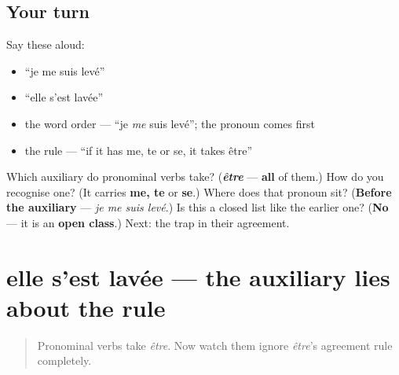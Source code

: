 \subsection*{Your turn}
Say these aloud:

\begin{itemize}
\raggedright
  \item \textquotedblleft{}je me suis levé\textquotedblright{}
  \item \textquotedblleft{}elle s'est lavée\textquotedblright{}
  \item the word order — \textquotedblleft{}je \emph{me} suis levé\textquotedblright{}; the pronoun comes first
  \item the rule — \textquotedblleft{}if it has me, te or se, it takes être\textquotedblright{}
\end{itemize}

\begin{tcolorbox}[breakable,colback=teal!4,colframe=teal!35!black,title={Before you move on}]
Which auxiliary do pronominal verbs take? (\emph{\textbf{être}} — \textbf{all} of them.) How do you recognise one? (It carries \textbf{me, te} or \textbf{se}.) Where does that pronoun sit? (\textbf{Before the auxiliary} — \emph{je me suis levé}.) Is this a closed list like the earlier one? (\textbf{No} — it is an \textbf{open class}.) Next: the trap in their agreement.
\end{tcolorbox}
\section[elle s'est lavée / elle s'est lavé les …]{elle s'est lavée — the auxiliary lies about the rule}

\label{lesson:FR-C16-pronominal-accord}



\begin{quote}
Pronominal verbs take \emph{être}. Now watch them ignore \emph{être}'s agreement rule completely.
\end{quote}

